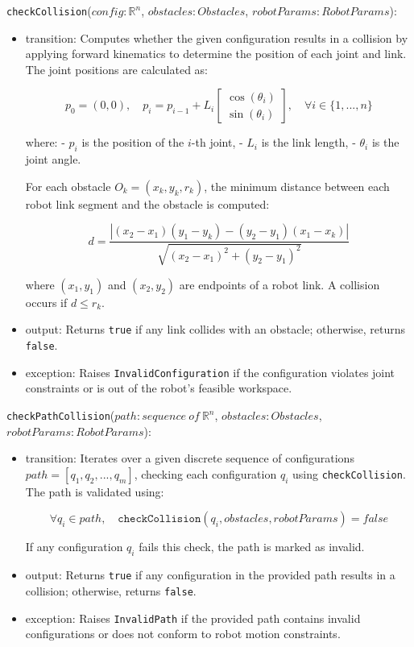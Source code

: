 \documentclass[12pt, titlepage]{article}
\begin{document}
\noindent \texttt{checkCollision}($config: \mathbb{R}^n$, $obstacles: Obstacles$, $robotParams: RobotParams$):
\begin{itemize}
\item transition: Computes whether the given configuration results in a collision by applying forward kinematics to determine the position of each joint and link. The joint positions are calculated as:

\[
p_0 = (0, 0), \quad p_i = p_{i-1} + L_i \begin{bmatrix} \cos(\theta_i) \\ \sin(\theta_i) \end{bmatrix}, \quad \forall i \in \{1, ..., n\}
\]

where:
  - \( p_i \) is the position of the \( i \)-th joint,
  - \( L_i \) is the link length,
  - \( \theta_i \) is the joint angle.

For each obstacle \( O_k = (x_k, y_k, r_k) \), the minimum distance between each robot link segment and the obstacle is computed:

\[
d = \frac{| (x_2 - x_1)(y_1 - y_k) - (y_2 - y_1)(x_1 - x_k) |}{\sqrt{(x_2 - x_1)^2 + (y_2 - y_1)^2}}
\]

where \( (x_1, y_1) \) and \( (x_2, y_2) \) are endpoints of a robot link. A collision occurs if \( d \leq r_k \).

\item output: Returns \texttt{true} if any link collides with an obstacle; otherwise, returns \texttt{false}.
\item exception: Raises \texttt{InvalidConfiguration} if the configuration violates joint constraints or is out of the robot's feasible workspace.
\end{itemize}

\noindent \texttt{checkPathCollision}($path: sequence\ of\ \mathbb{R}^n$, $obstacles: Obstacles$, $robotParams: RobotParams$):
\begin{itemize}
\item transition: Iterates over a given discrete sequence of configurations \( path = [q_1, q_2, ..., q_m] \), checking each configuration \( q_i \) using \texttt{checkCollision}. The path is validated using:

\[
\forall q_i \in path, \quad \texttt{checkCollision}(q_i, obstacles, robotParams) = false
\]

If any configuration \( q_i \) fails this check, the path is marked as invalid.

\item output: Returns \texttt{true} if any configuration in the provided path results in a collision; otherwise, returns \texttt{false}.
\item exception: Raises \texttt{InvalidPath} if the provided path contains invalid configurations or does not conform to robot motion constraints.
\end{itemize}
\end{document}
